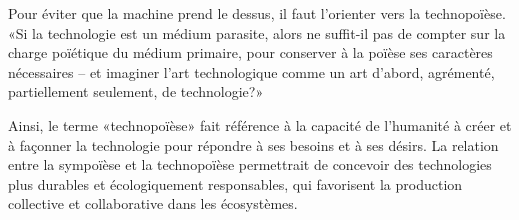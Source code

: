 Pour éviter que la machine prend le dessus, il faut l'orienter vers la technopoïèse. «Si la technologie est un médium parasite, alors ne suffit-il pas de compter sur la charge poïétique du médium primaire, pour conserver à la poïèse ses caractères nécessaires – et imaginer l’art technologique comme un art d’abord, agrémenté, partiellement seulement, de technologie?»~\cite{artiste_techno_conf_2012} %


Ainsi, le terme «technopoïèse» fait référence à la capacité de l'humanité à créer et à façonner la technologie pour répondre à ses besoins et à ses désirs. La relation entre la sympoïèse et la technopoïèse permettrait de concevoir des technologies plus durables et écologiquement responsables, qui favorisent la production collective et collaborative dans les écosystèmes. 






